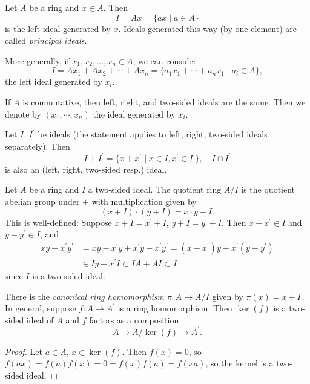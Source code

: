 \begin{xmpl}
Let $A$ be a ring and $x \in A$. Then
$$
I = A x = \{ ax \mid a \in A \}
$$
is the left ideal generated by $x$. Ideals generated this way (by one
element) are called \emph{principal ideals}.

More generally, if $x_1, x_2, \dots, x_n \in A$, we can consider
$$
  I
= Ax_1 + Ax_2 + \cdots + Ax_n
= \{ a_1 x_1 + \cdots + a_n x_1 \mid a_i \in A \},
$$
the left ideal generated by $x_i$.

If $A$ is commutative, then left, right, and two-sided ideals are the
same. Then we denote by $(x_1, \cdots, x_n)$ the ideal generated by
$x_i$.
\end{xmpl}

\begin{prop}
Let $I$, $I^\prime$ be ideals (the statement applies to left,
right, two-sided ideals separately). Then
$$
I + I^\prime = \{
                 x + x^\prime
              \mid
                 x \in I, x^\prime \in I^\prime
              \}, \quad
I \cap I^\prime
$$
is also an (left, right, two-sided resp.) ideal.
\end{prop}

\begin{defn}
Let $A$ be a ring and $I$ a two-sided ideal. The quotient ring $A / I$
is the quotient abelian group under $+$ with multiplication given by
$$
(x + I) \cdot (y + I) = x \cdot y + I.
$$
This is well-defined: Suppose $x + I = x^\prime + I$, $y + I =
y^\prime + I$. Then $x - x^\prime \in I$ and $y - y^\prime \in I$, and
\begin{align*}
   xy - x^\prime y^\prime
&= xy - x^\prime y + x^\prime y - x^\prime y^\prime
 = (x - x^\prime)y + x^\prime(y - y^\prime) \\
&\in I y + x^\prime I \subset I A + A I \subset I
\end{align*}
since $I$ is a two-sided ideal.
\end{defn}

\begin{prop}
There is the \emph{canonical ring homomorphism}
$\pi : A \to A / I$ given by $\pi(x) = x + I$.
In general, suppose $f : A \to A^\prime$ is a ring homomorphism. Then
$\ker(f)$ is a two-sided ideal of $A$ and $f$ factors as a composition
$$
A \to A / \ker(f) \to A^\prime.
$$
\end{prop}
\begin{proof}
Let $a \in A$, $x \in \ker(f)$. Then $f(x) = 0$, so
$f(ax) = f(a)f(x) = 0 = f(x)f(a) = f(xa)$, so the kernel is a
two-sided ideal.
\end{proof}

